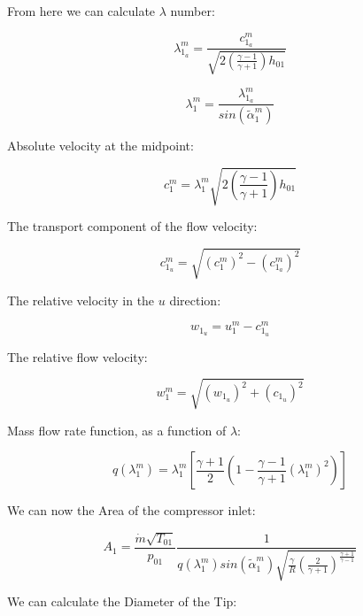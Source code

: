 \documentclass[titlepage]{article}
\begin{document}
From here we can calculate $\lambda$ number: 

\begin{equation}
    \lambda_{1_{a}}^{m} = \frac{c_{1_{a}}^{m}}{\sqrt{2\left(\frac{\gamma-1}{\gamma+1}\right) h_{01}}}
\end{equation}

\begin{equation}
    \lambda_{1}^{m} = \frac{\lambda_{1_{a}}^{m}}{sin(\tilde{\alpha}_{1}^{m})}
\end{equation}


Absolute velocity at the midpoint:

\begin{equation}
    c_{1}^{m} = \lambda_{1}^{m} \sqrt{2\left(\frac{\gamma-1}{\gamma+1}\right) h_{01}}
\end{equation}

The transport component of the flow velocity:

\begin{equation}
    c_{1_{u}}^{m} = \sqrt{(c_{1}^{m})^{2} - (c_{1_{a}}^{m})^{2}}
\end{equation}

The relative velocity in the $u$ direction:

\begin{equation} 
    w_{1_{u}} = u_{1}^{m} - c_{1_{u}}^{m}
\end{equation}

The relative flow velocity:

\begin{equation}
    w_{1}^{m} = \sqrt{(w_{1_{u}})^{2} + (c_{1_{u}})^{2}}
\end{equation}

Mass flow rate function, as a function of $\lambda$:

\begin{equation}
    q(\lambda_{1}^{m}) = \lambda_{1}^{m} \left[\frac{\gamma+1}{2}\left(1 - \frac{\gamma-1}{\gamma+1} (\lambda_{1}^{m})^{2}\right) \right]
\end{equation}


We can now the Area of the compressor inlet:

\begin{equation}
    A_{1} = \frac{\dot{m}\sqrt{T_{01}}}{p_{01}} \frac{1}{q(\lambda_{1}^{m}) sin(\tilde{\alpha}_{1}^{m}) \sqrt{\frac{\gamma}{R} \left(\frac{2}{\gamma+1} \right)^{\frac{\gamma+1}{\gamma-1}} }}
\end{equation}

We can calculate the Diameter of the Tip:
\end{document}
